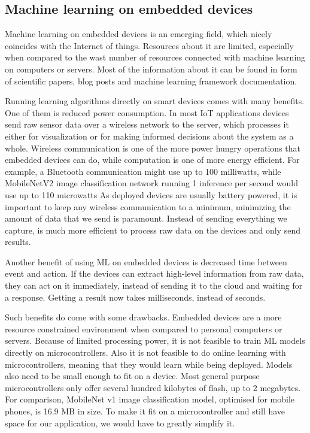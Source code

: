 \subsection{ Machine learning on embedded devices} \label{ml_on_embedded}

Machine learning on embedded devices is an emerging field, which nicely coincides with the Internet of things.
Resources about it are limited, especially when compared to the wast number of resources connected with machine learning on computers or servers.
Most of the information about it can be found in form of scientific papers, blog posts and machine learning framework documentation\cite{hello_edge}\cite{tflite_risc-v}\cite{pete_tiny}.

Running learning algorithms directly on smart devices comes with many benefits.
One of them is reduced power consumption.
In most IoT applications devices send raw sensor data over a wireless network to the server, which processes it either for visualization or for making informed decisions about the system as a whole. 
Wireless communication is one of the more power hungry operations that embedded devices can do, while computation is one of more energy efficient\cite{pete_tiny}.
For example, a Bluetooth communication might use up to 100 milliwatts, while MobileNetV2 image classification network running 1 inference per second would use up to 110 microwatts\cite{pete_tiny}
As deployed devices are usually battery powered, it is important to keep any wireless communication to a minimum, minimizing the amount of data that we send is paramount.
Instead of sending everything we capture, is much more efficient to process raw data on the devices and only send results.

Another benefit of using ML on embedded devices is decreased time between event and action.
If the devices can extract high-level information from raw data, they can act on it immediately, instead of sending it to the cloud and waiting for a response. 
Getting a result now takes milliseconds, instead of seconds.

Such benefits do come with some drawbacks.
Embedded devices are a more resource constrained environment when compared to personal computers or servers.
Because of limited processing power, it is not feasible to train ML models directly on microcontrollers.
Also it is not feasible to do online learning with microcontrollers, meaning that they would learn while being deployed.
Models also need to be small enough to fit on a device. 
Most general purpose microcontrollers only offer several hundred kilobytes of flash, up to 2 megabytes.
For comparison, MobileNet v1 image classification model, optimised for mobile phones, is 16.9 MB in size\cite{daniel_edgeimpulse}.
To make it fit on a microcontroller and still have space for our application, we would have to greatly simplify it.

